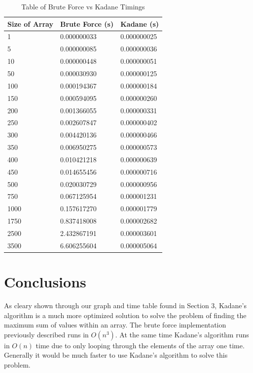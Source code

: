 \documentclass[10pt, letterpaper]{article}
\begin{document}
\begin{table}[htb!]
	\begin{center}
	\caption{
		\label{fig:time-table} Table of Brute Force vs Kadane Timings}
	\medskip
	\begin{tabular}{ | p{2cm} | l | l | }
		\hline
		Size of Array & Brute Force (s) & Kadane (s) \\ \hline
		1 & 0.000000033 & 0.000000025 \\ \hline
		5 & 0.000000085 & 0.000000036 \\ \hline
		10 & 0.000000448 & 0.000000051 \\ \hline
		50 & 0.000030930 & 0.000000125 \\ \hline
		100 & 0.000194367 & 0.000000184 \\ \hline
		150 & 0.000594095 & 0.000000260 \\ \hline
		200 & 0.001366055 & 0.000000331 \\ \hline
		250 & 0.002607847 & 0.000000402 \\ \hline
		300 & 0.004420136 & 0.000000466 \\ \hline
		350 & 0.006950275 & 0.000000573 \\ \hline
		400 & 0.010421218 & 0.000000639 \\ \hline
		450 & 0.014655456 & 0.000000716 \\ \hline
		500 & 0.020030729 & 0.000000956 \\ \hline
		750 & 0.067125954 & 0.000001231 \\ \hline
		1000 & 0.157617270 & 0.000001779 \\ \hline
		1750 & 0.837418008 & 0.000002682 \\ \hline
		2500 & 2.432867191 & 0.000003601 \\ \hline
		3500 & 6.606255604 & 0.000005064 \\ \hline
	\end{tabular}
	\end{center}
\end{table}

	\section{Conclusions}
	As cleary shown through our graph and time table found in Section 3,
	Kadane's algorithm is a much more optimized solution to solve the problem of finding the maximum sum of values within an array.
	The brute force implementation previously described runs in $O(n^3).$
	At the same time Kadane's algorithm runs in $O(n)$ time due to only looping through the elements of the array one time.
	Generally it would be much faster to use Kadane's algorithm to solve this problem.
\end{document}
